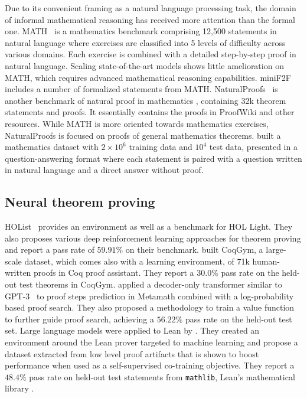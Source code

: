 Due to its convenient framing as a natural language processing task, the domain of informal mathematical reasoning has received more attention than the formal one. MATH~\citep{hendrycks2021measuring} is a mathematics benchmark comprising 12,500 statements in natural language where exercises are classified into 5 levels of difficulty across various domains. Each exercise is combined with a detailed step-by-step proof in natural language. Scaling state-of-the-art models shows little amelioration on MATH, which requires advanced mathematical reasoning capabilities. \textsf{miniF2F} includes a number of formalized statements from MATH. NaturalProofs~\citep{welleck2021naturalproofs} is another benchmark of natural proof in mathematics , containing 32k theorem statements and proofs. It essentially contains the proofs in ProofWiki and other resources. While MATH is more oriented towards mathematics exercises, NaturalProofs is focused on proofs of general mathematics theorems. \citet{saxton2019analysing} built a mathematics dataset with $2\times10^6$ training data and $10^4$ test data, presented in a question-answering format where each statement is paired with a question written in natural language and a direct answer without proof.

\subsection*{Neural theorem proving} HOList~\citep{bansal2019holist,bansal2019learning,paliwal2020graph} provides an environment as well as a benchmark for HOL Light. They also proposes various deep reinforcement learning approaches for theorem proving and report a pass rate of $59.91\%$ on their benchmark. \citet{yang2019learning} built CoqGym, a large-scale dataset, which comes also with a learning environment, of 71k human-written proofs in Coq proof assistant. They report a $30.0\%$ pass rate on the held-out test theorems in CoqGym. \citet{polu2020generative} applied a decoder-only transformer similar to GPT-3~\citep{brown2020language} to proof steps prediction in Metamath combined with a log-probability based proof search. They also proposed a methodology to train a value function to further guide proof search, achieving a $56.22\%$ pass rate on the held-out test set. Large language models were applied to Lean by \citet{han2021proof}. They created an environment around the Lean prover targeted to machine learning and propose a dataset extracted from low level proof artifacts that is shown to boost performance when used as a self-supervised co-training objective. They report a $48.4\%$ pass rate on held-out test statements from \texttt{mathlib}, Lean's mathematical library \citep{DBLP:conf/cpp/X20}.


